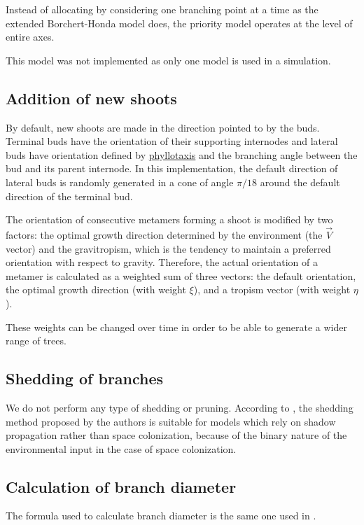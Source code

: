 \documentclass{article}
\begin{document}
Instead of allocating by considering one branching point at a time as the extended Borchert-Honda model does, the priority model operates at the level of entire axes.

This model was not implemented as only one model is used in a simulation.

\subsection{Addition of new shoots}

By default, new shoots are made in the direction pointed to by the buds.
Terminal buds have the orientation of their supporting internodes and lateral buds have orientation defined by \href{https://en.wikipedia.org/wiki/Phyllotaxis}{phyllotaxis} and the branching angle between the bud and its parent internode.
In this implementation, the default direction of lateral buds is randomly generated in a cone of angle \(\pi / 18\) around the default direction of the terminal bud.

The orientation of consecutive metamers forming a shoot is modified by two factors: the optimal growth direction determined by the environment (the \(\vec{V}\) vector) and the gravitropism, which is the tendency to maintain a preferred orientation with respect to gravity.
Therefore, the actual orientation of a metamer is calculated as a weighted sum of three vectors: the default orientation, the optimal growth direction (with weight \(\xi\)), and a tropism vector (with weight \(\eta\)).

These weights can be changed over time in order to be able to generate a wider range of trees.

\subsection{Shedding of branches}

We do not perform any type of shedding or pruning. According to \cite{Palubicki2009}, the shedding method proposed by the authors is suitable for models which rely on shadow propagation rather than space colonization, because of the binary nature of the environmental input in the case of space colonization.

\subsection{Calculation of branch diameter}
The formula used to calculate branch diameter is the same one used in \cite{Palubicki2009}.
\end{document}
